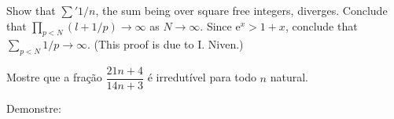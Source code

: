 \documentclass[english]{IMTexam}
\begin{document}
\begin{questions}
		
		\question\label{ques:IR:2.27} Show that $ \sum'1/n $, the sum being over square free integers, diverges. Conclude that $ \prod_{p<N}(l + 1/p)\to\infty $ as $ N \to \infty $. Since $ \mathrm{e}^{x}>1+x $, conclude that $ \sum_{p<N}1/p\to\infty $. (This proof is due to I. Niven.)
		
		\begin{solution}
			
		\end{solution}
		
		\question\label{ques:BMST:1.1} Mostre que a fração $ \dfrac{21n+4}{14n+3} $ é irredutível para todo $ n $ natural.
		
		\begin{solution}
			
		\end{solution}
		
		\question\label{ques:BMST:1.3} Demonstre:
\end{questions}
\end{document}
